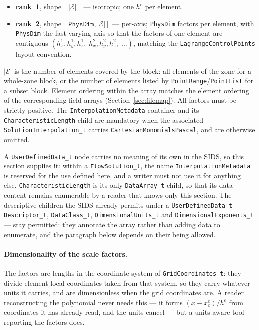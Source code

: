 \documentclass[11pt,letterpaper]{article}
\newif\ifvfourdraft
\newcommand{\vfourmark}{\ifvfourdraft\textcolor{v4violet}{\textbf{[v4]}}\ \fi}
\begin{document}
{\sloppy
\begin{itemize}
  \item \textbf{rank~1}, shape $[|\mathcal{E}|]$ --- isotropic; one $h^e$ per element.
  \item \textbf{rank~2}, shape $[\texttt{PhysDim}, |\mathcal{E}|]$ --- per-axis;
    \texttt{PhysDim} factors per element, with \texttt{PhysDim} the fast-varying axis
    so that the factors of one element are contiguous
    $(h^1_x, h^1_y, h^1_z,\; h^2_x, h^2_y, h^2_z,\; \ldots)$, matching the
    \texttt{LagrangeControlPoints} layout convention.
\end{itemize}
\par}

\noindent$|\mathcal{E}|$ is the number of elements covered by the block: all elements of
the zone for a whole-zone block, or the number of elements listed by
\texttt{PointRange}/\texttt{PointList} for a subset block.  Element ordering within the
array matches the element ordering of the corresponding field arrays
(Section~\ref{sec:filemap}).  All factors must be strictly positive.  The
\texttt{InterpolationMetadata} container and its \texttt{CharacteristicLength}
child are mandatory when the associated \texttt{SolutionInterpolation\_t} carries
\texttt{CartesianMonomialsPascal}, and are otherwise omitted.

\vfourmark A \texttt{UserDefinedData\_t} node carries no meaning of its own in the
SIDS, so this section supplies it: within a \texttt{FlowSolution\_t}, the name
\texttt{InterpolationMetadata} is reserved for the use defined here, and a writer
must not use it for anything else.  \texttt{CharacteristicLength} is its only
\texttt{DataArray\_t} child, so that its data content remains enumerable by a
reader that knows only this section.  The descriptive children the SIDS already
permits under a \texttt{UserDefinedData\_t} --- \texttt{Descriptor\_t},
\texttt{DataClass\_t}, \texttt{DimensionalUnits\_t} and
\texttt{DimensionalExponents\_t} --- stay permitted: they annotate the array
rather than adding data to enumerate, and the paragraph below depends on their
being allowed.

\paragraph{\vfourmark Dimensionality of the scale factors.}
The factors are lengths in the coordinate system of \texttt{GridCoordinates\_t}:
they divide element-local coordinates taken from that system, so they carry
whatever units it carries, and are dimensionless when the grid coordinates are.
A reader reconstructing the polynomial never needs this --- it forms
$(x-x^e_c)/h^e$ from coordinates it has already read, and the units cancel --- but
a units-aware tool reporting the factors does.
\end{document}
